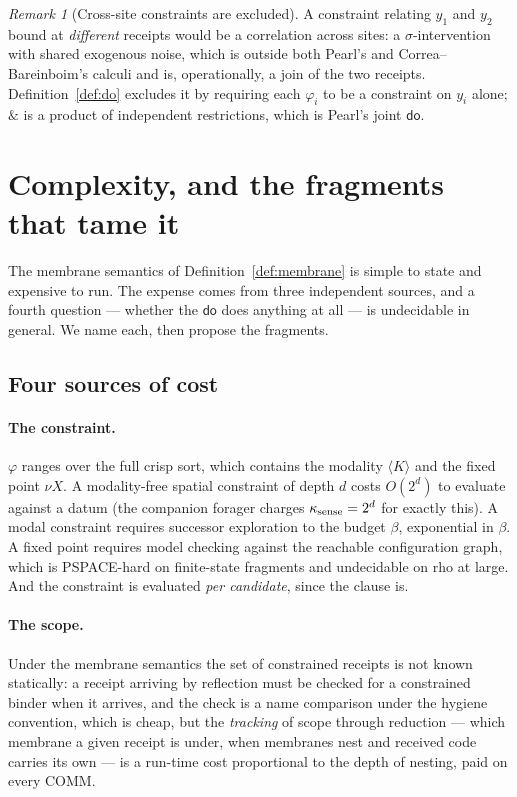 \documentclass[11pt,a4paper]{article}
\theoremstyle{plain}
\theoremstyle{definition}
\theoremstyle{remark}
\newtheorem{remark}[theorem]{Remark}
\newcommand{\rhoc}{\textsf{rho}}
\newcommand{\dok}{\textsf{do}}
\begin{document}
\begin{remark}[Cross-site constraints are excluded]
A constraint relating $y_1$ and $y_2$ bound at \emph{different} receipts would
be a correlation across sites: a $\sigma$-intervention with shared exogenous
noise, which is outside both Pearl's and Correa--Bareinboim's calculi and is,
operationally, a join of the two receipts. Definition~\ref{def:do} excludes it by
requiring each $\varphi_i$ to be a constraint on $y_i$ alone; $\&$ is a product of
independent restrictions, which is Pearl's joint $\dok$.
\end{remark}

\section{Complexity, and the fragments that tame it}\label{sec:complexity}

The membrane semantics of Definition~\ref{def:membrane} is simple to state and
expensive to run. The expense comes from three independent sources, and a
fourth question --- whether the $\dok$ does anything at all --- is undecidable in
general. We name each, then propose the fragments.

\subsection{Four sources of cost}

\paragraph{The constraint.} $\varphi$ ranges over the full crisp sort, which
contains the modality $\langle K\rangle$ and the fixed point $\nu X$. A
modality-free spatial constraint of depth $d$ costs $O(2^d)$ to evaluate against
a datum (the companion forager charges $\kappa_{\rm sense} = 2^d$ for exactly
this). A modal constraint requires successor exploration to the budget $\beta$,
exponential in $\beta$. A fixed point requires model checking against the
reachable configuration graph, which is PSPACE-hard on finite-state fragments
and undecidable on \rhoc{} at large. And the constraint is evaluated
\emph{per candidate}, since the clause is.

\paragraph{The scope.} Under the membrane semantics the set of constrained
receipts is not known statically: a receipt arriving by reflection must be
checked for a constrained binder when it arrives, and the check is a name
comparison under the hygiene convention, which is cheap, but the
\emph{tracking} of scope through reduction --- which membrane a given receipt is
under, when membranes nest and received code carries its own --- is a run-time
cost proportional to the depth of nesting, paid on every COMM.
\end{document}
